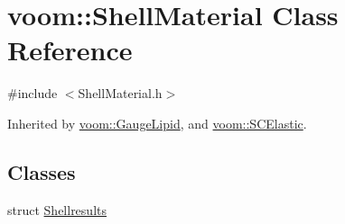 \hypertarget{classvoom_1_1_shell_material}{
\section{voom::ShellMaterial Class Reference}
\label{classvoom_1_1_shell_material}
}


{\ttfamily \#include $<$ShellMaterial.h$>$}

Inherited by \hyperlink{classvoom_1_1_gauge_lipid}{voom::GaugeLipid}, and \hyperlink{classvoom_1_1_s_c_elastic}{voom::SCElastic}.\subsection*{Classes}
\begin{DoxyCompactItemize}
\item 
struct \hyperlink{structvoom_1_1_shell_material_1_1_shellresults}{Shellresults}
\end{DoxyCompactItemize}
